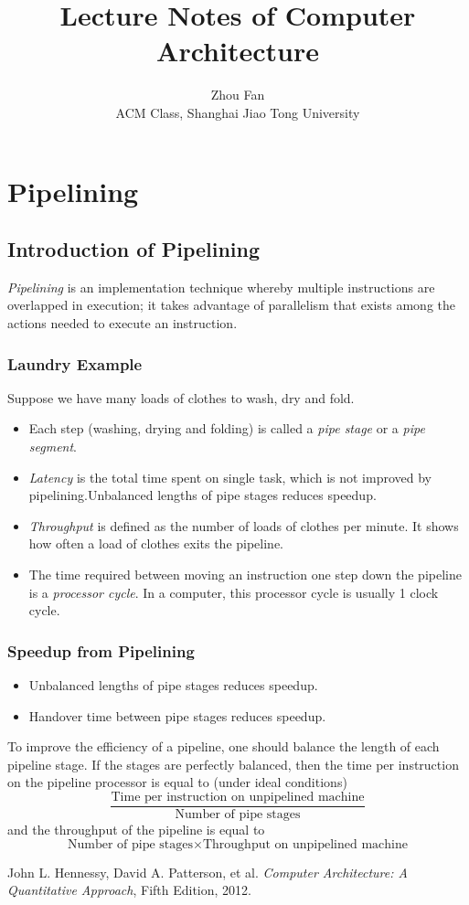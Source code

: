 \documentclass[12pt, a4paper]{article}
\title{Lecture Notes of Computer Architecture}
\author{Zhou Fan\\ACM Class, Shanghai Jiao Tong University}
\date{}
\theoremstyle{margin}
\begin{document}
\maketitle
\tableofcontents
\newpage

\section{Pipelining}
  \subsection{Introduction of Pipelining}
    \emph{Pipelining} is an implementation technique whereby multiple instructions are overlapped in execution; it takes advantage of parallelism that exists among the actions needed to execute an instruction.\cite{caqa}
    \subsubsection{Laundry Example}
      Suppose we have many loads of clothes to wash, dry and fold. 
      \begin{itemize}
        \item Each step (washing, drying and folding) is called a \emph{pipe stage} or a \emph{pipe segment}. 
        \item \emph{Latency} is the total time spent on single task, which is not improved by pipelining.Unbalanced lengths of pipe stages reduces speedup. 
        \item \emph{Throughput} is defined as the number of loads of clothes per minute. It shows how often a load of clothes exits the pipeline.
        \item The time required between moving an instruction one step down the pipeline is a \emph{processor cycle}. In a computer, this processor cycle is usually 1 clock cycle.
      \end{itemize}
    \subsubsection{Speedup from Pipelining}
      \begin{itemize}
        \item Unbalanced lengths of pipe stages reduces speedup. 
        \item Handover time between pipe stages reduces speedup.
      \end{itemize}
      To improve the efficiency of a pipeline, one should balance the length of each pipeline stage. If the stages are perfectly balanced, then the time per instruction on the pipeline processor is equal to (under ideal conditions) 
      $$\frac{\text{Time per instruction on unpipelined machine}}{\text{Number of pipe stages}}$$
      and the throughput of the pipeline is equal to
      $$\text{Number of pipe stages} \times \text{Throughput on unpipelined machine}$$


\begin{thebibliography}{9}
    John L. Hennessy, David A. Patterson, et al.
    \emph{Computer Architecture: A Quantitative Approach},
    Fifth Edition, 2012. 
\end{thebibliography}
\end{document}
